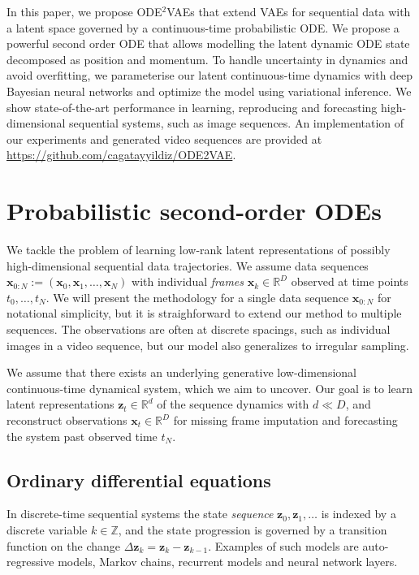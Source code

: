 \documentclass{article}
\newcommand{\x}{\mathbf{x}}
\newcommand{\z}{\mathbf{z}}
\newcommand{\R}{\mathbb{R}}
\newcommand{\0}{\mathbf{0}}
\begin{document}
In this paper, we propose ODE$^2$VAEs that extend VAEs for sequential data with a latent space governed by a continuous-time probabilistic ODE. We propose a powerful second order ODE that allows modelling the latent dynamic ODE state decomposed as position and momentum. 
To handle uncertainty in dynamics and avoid overfitting, we parameterise our latent continuous-time dynamics with deep Bayesian neural networks and optimize the model using variational inference. 
We show state-of-the-art performance in learning, reproducing and forecasting  high-dimensional sequential systems, such as image sequences.
An implementation of our experiments and generated video sequences are provided at \href{https://github.com/cagatayyildiz/ODE2VAE}{https://github.com/cagatayyildiz/ODE2VAE}.

\section{Probabilistic second-order ODEs}


We tackle the problem of learning low-rank latent representations of possibly high-dimensional sequential data trajectories. We assume data sequences $\x_{0:N} := (\x_0, \x_1, \ldots, \x_N)$ with individual \emph{frames} $\x_k \in \R^D$ observed at time points $t_0, \ldots, t_N$. We will present the methodology for a single data sequence $\x_{0:N}$ for notational simplicity, but it is straighforward to extend our method to multiple sequences. The observations are often at discrete spacings, such as individual images in a video sequence, but our model also generalizes to irregular sampling. 

We assume that there exists an underlying generative low-dimensional continuous-time dynamical system, which we aim to uncover. Our goal is to learn latent representations $\z_t \in \R^d$ of the sequence dynamics with $d \ll D$, and reconstruct observations $\x_t \in \mathbb{R}^D$ for missing frame imputation and forecasting the system past observed time $t_N$.

\subsection{Ordinary differential equations}
In discrete-time sequential systems the state \emph{sequence} $\z_0, \z_1, \ldots$ is indexed by a discrete variable $k \in \mathbb{Z}$, and the state progression is governed by a transition function on the change $\Delta \z_k = \z_k - \z_{k-1}$. Examples of such models are auto-regressive models, Markov chains, recurrent models and neural network layers.
\end{document}
